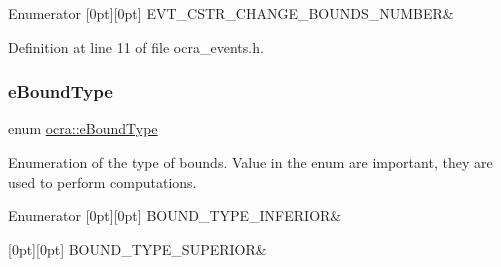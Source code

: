 \begin{DoxyEnumFields}{Enumerator}
[0pt][0pt]{}\hypertarget{namespaceocra_a8187c7d0d2534546e0d40cec907fd2afa418e9564ea4db522807913b59f5656bb}{}\label{namespaceocra_a8187c7d0d2534546e0d40cec907fd2afa418e9564ea4db522807913b59f5656bb} 
E\+V\+T\+\_\+\+C\+S\+T\+R\+\_\+\+C\+H\+A\+N\+G\+E\+\_\+\+B\+O\+U\+N\+D\+S\+\_\+\+N\+U\+M\+B\+ER&\\
\hline

\end{DoxyEnumFields}


Definition at line 11 of file ocra\+\_\+events.\+h.

\hypertarget{namespaceocra_ab3efdc117d9e5bcb0192640f5e7dc79b}{}\label{namespaceocra_ab3efdc117d9e5bcb0192640f5e7dc79b} 
\subsubsection{\texorpdfstring{e\+Bound\+Type}{eBoundType}}
{\footnotesize\ttfamily enum \hyperlink{namespaceocra_ab3efdc117d9e5bcb0192640f5e7dc79b}{ocra\+::e\+Bound\+Type}}

Enumeration of the type of bounds. Value in the enum are important, they are used to perform computations. \begin{DoxyEnumFields}{Enumerator}
[0pt][0pt]{}\hypertarget{namespaceocra_ab3efdc117d9e5bcb0192640f5e7dc79bac7dd70ebf0ff3f38096ffdc0ad87a8c9}{}\label{namespaceocra_ab3efdc117d9e5bcb0192640f5e7dc79bac7dd70ebf0ff3f38096ffdc0ad87a8c9} 
B\+O\+U\+N\+D\+\_\+\+T\+Y\+P\+E\+\_\+\+I\+N\+F\+E\+R\+I\+OR&\\
\hline

[0pt][0pt]{}\hypertarget{namespaceocra_ab3efdc117d9e5bcb0192640f5e7dc79ba4f07d457a95f88d73086896448538f0e}{}\label{namespaceocra_ab3efdc117d9e5bcb0192640f5e7dc79ba4f07d457a95f88d73086896448538f0e} 
B\+O\+U\+N\+D\+\_\+\+T\+Y\+P\+E\+\_\+\+S\+U\+P\+E\+R\+I\+OR&\\
\hline

\end{DoxyEnumFields}



